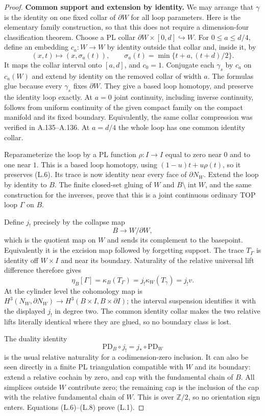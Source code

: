 \begin{proof}
\textbf{Common support and extension by identity.}
We may arrange that $\gamma$ is the identity on one
fixed collar of $\partial W$ for all loop parameters.
Here is the elementary family construction, so that this
does not require a dimension-four classification theorem.
Choose a PL collar $\partial W\times[0,d]\hookrightarrow W$.
For $0\le a\le d/4$, define an embedding $c_a:W\to W$
by identity outside that collar and, inside it, by
\[
 (x,t)\longmapsto(x,\sigma_a(t)),\qquad
 \sigma_a(t)=\min\{t+a,(t+d)/2\}.
\]
It maps the collar interval onto $[a,d]$, and $c_0=1$.
Conjugate each $\gamma_s$ by $c_a$ on $c_a(W)$ and
extend by identity on the removed collar of width $a$.
The formulas glue because every $\gamma_s$ fixes
$\partial W$. They give a based loop homotopy, and
preserve the identity loop exactly. At $a=0$ joint
continuity, including inverse continuity, follows from
uniform continuity of the given compact family on the
compact manifold and its fixed boundary. Equivalently,
the same collar compression was verified in A.135--A.136.
At $a=d/4$ the whole loop has one common identity collar.

Reparameterize the loop by a PL function $\rho:I\to I$
equal to zero near $0$ and to one near $1$. This is a
based loop homotopy, using
$(1-u)t+u\rho(t)$, so it preserves (L.6). Its trace is
now identity near every face of $\partial N_W$.
Extend the loop by identity to $B$. The finite closed-set
gluing of $W$ and $B\setminus\operatorname{int}W$, and
the same construction for the inverses, prove that this
is a joint continuous ordinary TOP loop $\Gamma$ on $B$.

Define $j_!$ precisely by the collapse map
\[
 B\longrightarrow W/\partial W,
\]
which is the quotient map on $W$ and sends its complement
to the basepoint. Equivalently it is the excision map
followed by forgetting support. The trace $T_\Gamma$
is identity off $W\times I$ and near its boundary.
Naturality of the relative universal lift difference
therefore gives
\[
          \eta_B[\Gamma]
          =\kappa_B(T_\Gamma)
          =j_!\kappa_W(T_\gamma)=j_!v.               \tag{L.7}
\]
At the cylinder level the cohomology map is
$H^3(N_W,\partial N_W)\to H^3(B\times I,B\times\partial I)$;
the interval suspension identifies it with the displayed
$j_!$ in degree two. The common identity collar makes
the two relative lifts literally identical where they
are glued, so no boundary class is lost.

The duality identity
\[
       \mathrm{PD}_B\circ j_!
                    =j_*\circ\mathrm{PD}_W           \tag{L.8}
\]
is the usual relative naturality for a codimension-zero
inclusion. It can also be seen directly in a finite PL
triangulation compatible with $W$ and its boundary:
extend a relative cochain by zero, and cap with the
fundamental chain of $B$. All simplices outside $W$
contribute zero; the remaining cap is the inclusion of
the cap with the relative fundamental chain of $W$.
This is over $\mathbb Z/2$, so no orientation sign enters.
Equations (L.6)--(L.8) prove (L.1).


\end{proof}
